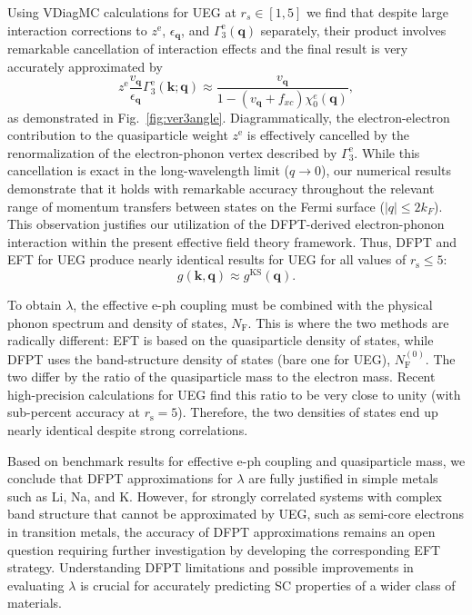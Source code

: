 \documentclass[%
 reprint,
superscriptaddress,
 amsmath,amssymb,
 aps,
prx,
]{revtex4-2}
\newcommand{\bq}{\mathbf{q}}
\newcommand{\bk}{\mathbf{k}}
\newcommand{\txe}{\text{e}}
\newcommand{\txs}{\text{s}}
\newcommand{\txF}{\text{F}}
\newcommand{\txKS}{\text{KS}}
\begin{document}
Using VDiagMC calculations for UEG at $r_s \in [1,5]$ we find that despite large interaction corrections to $z^{\txe}$,  $\epsilon_\bq$, and $\Gamma_3^\txe(\bq)$ separately, their product involves remarkable cancellation of interaction effects and the final result is very accurately
approximated by
\begin{equation}
z^\txe\frac{v_\bq}{\epsilon_\bq}\Gamma^\txe_3(\bk; \bq) \approx \frac{v_{\bq}}{1-(v_{\bq}+f_{xc})\chi_0^e(\bq)},
\label{eq:epi_ansatz}
\end{equation}
as demonstrated in Fig.~\ref{fig:ver3angle}. 
Diagrammatically, the electron-electron contribution to the quasiparticle weight $z^{\txe}$ is effectively cancelled by the renormalization of the electron-phonon vertex described by $\Gamma^\txe_3$. While this cancellation is exact in the long-wavelength limit ($q\rightarrow0$), our numerical results demonstrate that it holds with remarkable accuracy throughout the relevant range of momentum transfers between states on the Fermi surface ($|q| \le 2k_F$). This observation justifies our utilization of the DFPT-derived electron-phonon interaction within the present effective field theory framework.
Thus, DFPT and EFT for UEG produce nearly identical results
for UEG for all values of $r_\txs \le 5$:
\begin{equation}
g(\bk, \bq) \approx g^{\txKS}(\bq).
\label{eq:DFPTagreement}
\end{equation}


To obtain $\lambda$, the effective e-ph coupling must be combined with the physical phonon spectrum and density of states, $N_\txF$. 
This is where the two methods are radically different:
EFT is based on the quasiparticle density of states, 
while DFPT uses the band-structure density of states (bare one for UEG), $N^{(0)}_\txF$.
The two differ by the ratio of the quasiparticle mass to the electron mass.  Recent high-precision calculations for UEG \cite{vdiagmc2, markus_2023}
find this ratio to be very close to unity (with sub-percent accuracy at $r_\txs =5$). Therefore, the two densities of states end up nearly identical despite strong correlations.

Based on benchmark results for effective e-ph coupling and quasiparticle mass, we conclude that DFPT approximations for $\lambda$ are fully justified in simple metals such as Li, Na, and K. However, for strongly correlated systems
with complex band structure that cannot be approximated by UEG, 
such as semi-core electrons in transition metals, the accuracy of  
DFPT approximations remains an open question requiring further investigation 
by developing the corresponding  EFT strategy. Understanding DFPT limitations
and possible improvements in evaluating $\lambda$ is crucial for accurately predicting SC properties of a wider class of materials.
\end{document}
